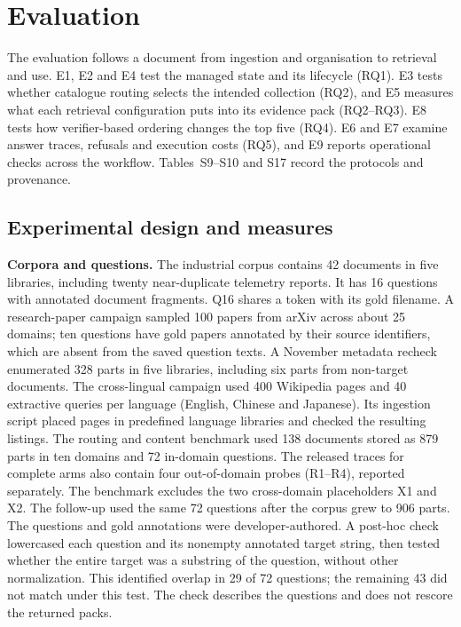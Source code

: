 \section{Evaluation}
\label{sec:eval}
The evaluation follows a document from ingestion and organisation to
retrieval and use. E1, E2 and E4 test the managed state and its lifecycle
(RQ1). E3 tests whether catalogue routing selects the intended collection
(RQ2), and E5 measures what each retrieval configuration puts into its
evidence pack (RQ2--RQ3). E8 tests how verifier-based ordering changes the
top five (RQ4). E6 and E7 examine answer traces, refusals and execution
costs (RQ5), and E9 reports operational checks across the workflow.
Tables~S9--S10 and S17 record the protocols and provenance.

\subsection{Experimental design and measures}
\label{sec:eval-setup}

\textbf{Corpora and questions.} The industrial corpus contains 42 documents
in five libraries, including twenty near-duplicate telemetry reports. It
has 16 questions with annotated document fragments. Q16 shares a token with
its gold filename. A research-paper campaign sampled 100 papers from arXiv
across about 25 domains; ten questions have gold papers annotated by their
source identifiers, which are absent from the saved question texts.
A November
metadata recheck enumerated 328 parts in five libraries, including six parts
from non-target documents. The
cross-lingual campaign used 400 Wikipedia pages and 40 extractive queries per
language (English, Chinese and Japanese). Its ingestion script placed pages
in predefined language libraries and checked the resulting listings.
The routing and content benchmark used 138 documents stored as 879 parts in
ten domains and 72 in-domain questions. The released traces for complete
arms also contain four out-of-domain probes (R1--R4), reported separately.
The benchmark excludes the two cross-domain placeholders X1 and X2. The
follow-up used the same 72 questions after the corpus grew to 906 parts.
The questions and gold annotations were developer-authored. A post-hoc
check lowercased each question and its nonempty annotated target string,
then tested whether the entire target was a substring of the question,
without other normalization. This identified overlap in 29 of 72 questions;
the remaining 43 did not match under this test. The check describes the
questions and does not rescore the returned packs.

